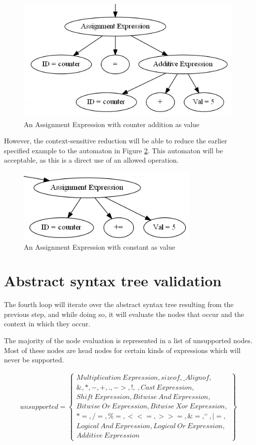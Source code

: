 \documentclass[12pt]{thesis}
\begin{document}
\begin{figure}[h]
	\centering
	\includegraphics[width=0.6\linewidth]{unfolded_addition}
	\caption{An Assignment Expression with counter addition as value}
	\label{fig:unfolded_addition}
\end{figure}

However, the context-sensitive reduction will be able to reduce the earlier specified example to the automaton in Figure \ref{fig:folded_addition}. This automaton will be acceptable, as this is a direct use of an allowed operation.

\begin{figure}[h]
	\centering
	\includegraphics[width=0.5\linewidth]{folded_addition}
	\caption{An Assignment Expression with constant as value}
	\label{fig:folded_addition}
\end{figure}

\section{Abstract syntax tree validation}
The fourth loop will iterate over the abstract syntax tree resulting from the previous step, and while doing so, it will evaluate the nodes that occur and the context in which they occur.

The majority of the node evaluation is represented in a list of unsupported nodes. Most of these nodes are head nodes for certain kinds of expressions which will never be supported.

\begin{align*}
	unsupported = \left\{ \begin{array}{l}
		Multiplication\ Expression, sizeof, \_Alignof, \\
		\&, *, -, +, ., ->, !, ~, Cast\ Expression, \\
		Shift\ Expression, Bitwise\ And\ Expression, \\
		Bitwise\ Or\ Expression, Bitwise\ Xor\ Expression, \\
		*=, /=, \%=, <<=, >>=, \&=, ^=, |=, \\
		Logical\ And\ Expression, Logical\ Or\ Expression, \\
		Additive\ Expression
	\end{array} \right\}
\end{align*}
\end{document}
